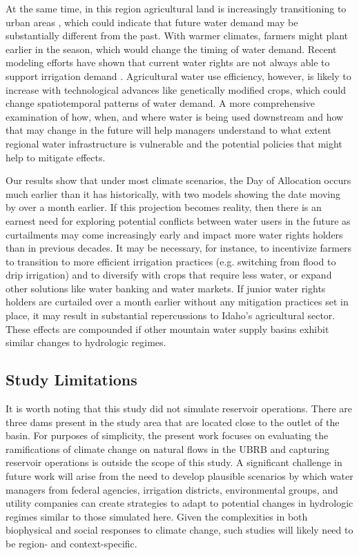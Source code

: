 \documentclass[11pt,letterpaper]{article}
\begin{document}
At the same time, in this region agricultural land is increasingly transitioning to urban areas \citep{Dahal:2017ux}, which could indicate that future water demand may be substantially different from the past. With warmer climates, farmers might plant earlier in the season, which would change the timing of water demand. Recent modeling efforts have shown that current water rights are not always able to support irrigation demand \citep{Han:2017tx}. Agricultural water use efficiency, however, is likely to increase with technological advances like genetically modified crops, which could change spatiotemporal patterns of water demand. A more comprehensive examination of how, when, and where water is being used downstream and how that may change in the future will help managers understand to what extent regional water infrastructure is vulnerable and the potential policies that might help to mitigate effects. 

Our results show that under most climate scenarios, the Day of Allocation occurs much earlier than it has historically, with two models showing the date moving by over a month earlier. If this projection becomes reality, then there is an earnest need for exploring potential conflicts between water users in the future as curtailments may come increasingly early and impact more water rights holders than in previous decades. It may be necessary, for instance, to incentivize farmers to transition to more efficient irrigation practices (e.g. switching from flood to drip irrigation) and to diversify with crops that require less water, or expand other solutions like water banking and water markets. If junior water rights holders are curtailed over a month earlier without any mitigation practices set in place, it may result in substantial repercussions to Idaho’s agricultural sector. These effects are compounded if other mountain water supply basins exhibit similar changes to hydrologic regimes. 

\subsection{Study Limitations}

It is worth noting that this study did not simulate reservoir operations. There are three dams present in the study area that are located close to the outlet of the basin. For purposes of simplicity, the present work focuses on evaluating the ramifications of climate change on natural flows in the UBRB and capturing reservoir operations is outside the scope of this study. A significant challenge in future work will arise from the need to develop plausible scenarios by which water managers from federal agencies, irrigation districts, environmental groups, and utility companies can create strategies to adapt to potential changes in hydrologic regimes similar to those simulated here. Given the complexities in both biophysical and social responses to climate change, such studies will likely need to be region- and context-specific.  
\end{document}
